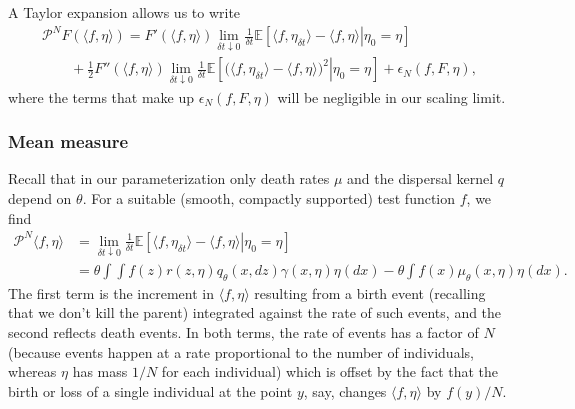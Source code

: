 \documentclass[12pt]{article}
\newcommand{\IE}{\mathbb E}
\newcommand{\Pgen}{\mathcal{P}}    %
\begin{document}
A Taylor expansion allows us to write
\begin{multline*}
    \Pgen^N
    F(\langle f,\eta \rangle)
    =
    F'(\langle f, \eta \rangle)
    \lim_{\delta t\downarrow 0} \frac{1}{\delta t}
    \IE\left[
        \left. \langle f, \eta_{\delta t} \rangle
        -
        \langle f, \eta \rangle
        \right| \eta_0=\eta
    \right]
    \\
    \qquad {}
    + \frac{1}{2}
        F''(\langle f,\eta\rangle)
    \lim_{\delta t\downarrow 0}\frac{1}{\delta t}
    \IE\left[
        \left.\big(\langle f,\eta_{\delta t}\rangle
        -
        \langle f, \eta\rangle\big)^2 \right|\eta_0=\eta
    \right]
    +
    \epsilon_N(f, F, \eta),
\end{multline*}
where the terms that make up 
$\epsilon_N(f, F, \eta)$
will be negligible in our scaling limit. 

\subsubsection*{Mean measure}

Recall that in our parameterization only death rates $\mu$
and the dispersal kernel $q$ depend on $\theta$.
For a suitable (smooth, compactly supported) test function $f$, we find
\begin{equation} \label{mean measure}
    \begin{split}
    \Pgen^N \langle f, \eta \rangle
    &=
    \lim_{\delta t\downarrow 0} \frac{1}{\delta t}
    \IE\left[ \left.
        \langle f, \eta_{\delta t} \rangle
        -
        \langle f, \eta\rangle
        \right| \eta_0 = \eta
    \right]
    \\
    &=
    \theta \int
        \int f(z) r(z,\eta) q_\theta(x,dz)
    \gamma(x, \eta) \eta(dx)
    -
    \theta \int f(x)\mu_\theta(x, \eta)
    \eta(dx).
    \end{split}
\end{equation}
The first term is the increment in $\langle f,\eta\rangle$
resulting from a birth event (recalling that
we don't kill the parent) integrated against the rate of such events,
and the second reflects death events.
In both terms,
the rate of events has a factor of $N$ (because events happen at a rate 
proportional to the number of individuals,
whereas $\eta$ has mass $1/N$ for each individual)
which is offset by the fact that  
the birth or loss of a single 
individual at the point $y$, say, changes $\langle f,\eta\rangle$
by $f(y)/N$.
\end{document}

